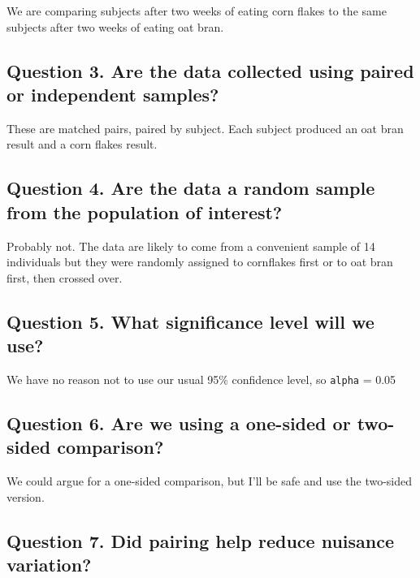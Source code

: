 \documentclass[
]{book}
\begin{document}
We are comparing subjects after two weeks of eating corn flakes to the same subjects after two weeks of eating oat bran.

\hypertarget{question-3.-are-the-data-collected-using-paired-or-independent-samples-1}{%
\subsection{Question 3. Are the data collected using paired or independent samples?}\label{question-3.-are-the-data-collected-using-paired-or-independent-samples-1}}

These are matched pairs, paired by subject. Each subject produced an oat bran result and a corn flakes result.

\hypertarget{question-4.-are-the-data-a-random-sample-from-the-population-of-interest-1}{%
\subsection{Question 4. Are the data a random sample from the population of interest?}\label{question-4.-are-the-data-a-random-sample-from-the-population-of-interest-1}}

Probably not. The data are likely to come from a convenient sample of 14 individuals but they were randomly assigned to cornflakes first or to oat bran first, then crossed over.

\hypertarget{question-5.-what-significance-level-will-we-use-1}{%
\subsection{Question 5. What significance level will we use?}\label{question-5.-what-significance-level-will-we-use-1}}

We have no reason not to use our usual 95\% confidence level, so \texttt{alpha} = 0.05

\hypertarget{question-6.-are-we-using-a-one-sided-or-two-sided-comparison-1}{%
\subsection{Question 6. Are we using a one-sided or two-sided comparison?}\label{question-6.-are-we-using-a-one-sided-or-two-sided-comparison-1}}

We could argue for a one-sided comparison, but I'll be safe and use the two-sided version.

\hypertarget{question-7.-did-pairing-help-reduce-nuisance-variation}{%
\subsection{Question 7. Did pairing help reduce nuisance variation?}\label{question-7.-did-pairing-help-reduce-nuisance-variation}}
\end{document}
